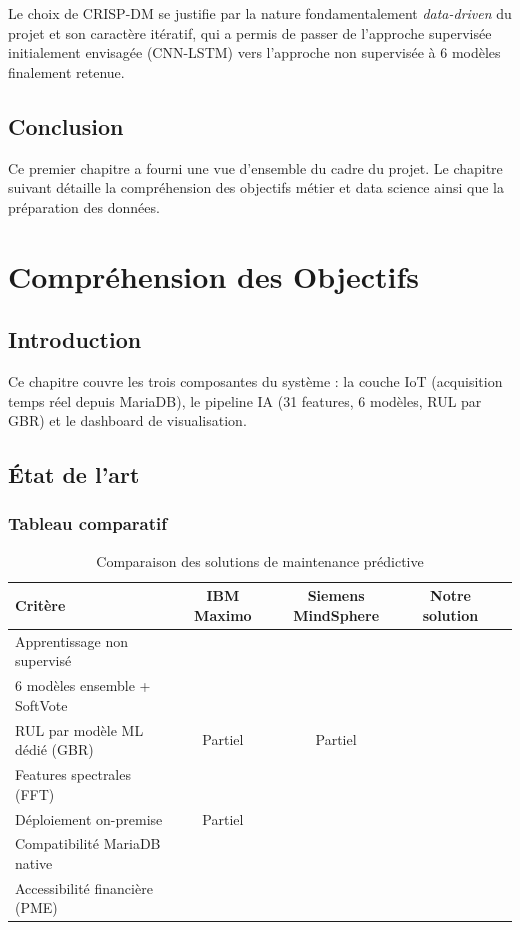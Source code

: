 \documentclass[12pt,a4paper]{report}
\newcommand{\cmark}{\ding{51}}
\newcommand{\xmark}{\ding{55}}
\begin{document}
Le choix de CRISP-DM se justifie par la nature fondamentalement \textit{data-driven}
du projet et son caractère itératif, qui a permis de passer de l'approche supervisée
initialement envisagée (CNN-LSTM) vers l'approche non supervisée à 6 modèles finalement retenue.

\section{Conclusion}

Ce premier chapitre a fourni une vue d'ensemble du cadre du projet. Le chapitre suivant
détaille la compréhension des objectifs métier et data science ainsi que la préparation des données.

\chapter{Compréhension des Objectifs}

\section{Introduction}

Ce chapitre couvre les trois composantes du système : la couche IoT (acquisition temps réel depuis MariaDB), le pipeline IA (31 features, 6 modèles, RUL par GBR) et le dashboard de visualisation.

\section{État de l'art}

\subsection{Tableau comparatif}

\begin{table}[h]
\centering
\caption{Comparaison des solutions de maintenance prédictive}
\label{tab:comparaison}
\begin{tabularx}{\textwidth}{Xcccc}
\toprule
\textbf{Critère} & \textbf{IBM Maximo} & \textbf{Siemens MindSphere} & \textbf{Notre solution} \\
\midrule
Apprentissage non supervisé   & \xmark & \xmark & \cmark \\
6 modèles ensemble + SoftVote  & \xmark & \xmark & \cmark \\
RUL par modèle ML dédié (GBR) & Partiel & Partiel & \cmark \\
Features spectrales (FFT)      & \cmark & \cmark & \cmark \\
Déploiement on-premise         & Partiel & \xmark & \cmark \\
Compatibilité MariaDB native   & \xmark & \xmark & \cmark \\
Accessibilité financière (PME) & \xmark & \xmark & \cmark \\
\bottomrule
\end{tabularx}
\end{table}
\end{document}
